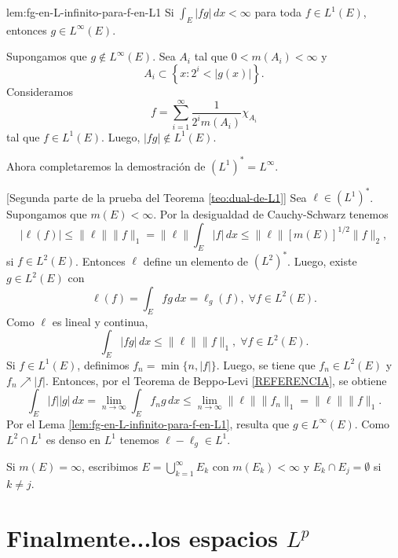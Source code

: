 \begin{lema}{lem:fg-en-L-infinito-para-f-en-L1}
Si 
$
\int_E |fg|\,dx <\infty
$
para toda $f \in L^1(E)$, entonces $g \in L^{\infty}(E)$.
\end{lema}

\begin{demo}
Supongamos que $g \notin L^{\infty}(E)$. Sea $A_i$ tal que $0<m(A_i)<\infty$ y 
\[
A_i\subset \left\{x: 2^i< |g(x)|\right\}.
\]
Consideramos  \[f = \sum\limits_{i=1}^{\infty} \frac{1}{2^im(A_i)} \chi_{A_i} \] tal que $f \in L^1(E)$. 
Luego, $|fg| \notin L^1(E)$.
\end{demo}

Ahora completaremos la demostraci\'on de
$(L^1)^*=L^{\infty}$.

\begin{demo}{}[Segunda parte de la prueba del Teorema \ref{teo:dual-de-L1}]
Sea $\ell \in (L^1)^*$. Supongamos que $m(E)<\infty$.
Por la desigualdad de Cauchy-Schwarz tenemos
\[
|\ell(f)|\leq \|\ell\|\|f\|_1=\|\ell\| \int_E |f|\,dx 
\leq \|\ell\| \left[m(E)\right]^{1/2}\|f\|_2, 
\]
si $f \in L^2(E)$.
Entonces $\ell$ define un elemento de $(L^2)^*$. Luego, existe $g \in L^2(E)$ con 
\[
\ell(f)=\int_E fg\,dx=\ell_g(f), \;\forall f \in L^2(E).
\]
Como $\ell$ es lineal y continua, 
\[
\int_E |fg|\,dx \leq \|\ell\| \|f\|_1, \;\forall f \in L^2(E).
\]
Si $f \in L^1(E)$, definimos $f_n=\min\{n, |f|\}$. Luego,  se tiene que $f_n \in L^2(E)$ y $f_n \nearrow |f|$. Entonces, por el Teorema de Beppo-Levi \ref{REFERENCIA}, se obtiene
\[
\int_E |f| |g|\,dx =\lim\limits_{n \to \infty} \int_E f_n g\,dx 
\leq \lim\limits_{n \to \infty} \|\ell\| \|f_n\|_1
=\|\ell\| \|f\|_1.\]
Por el Lema \ref{lem:fg-en-L-infinito-para-f-en-L1}, resulta que $g \in L^{\infty}(E)$.
Como $L^2 \cap L^1$ es denso en $L^1$ tenemos $\ell-\ell_g \in L^1$.

Si $m(E)=\infty$, escribimos $E=\bigcup\limits_{k=1}^{\infty} E_k$
con $m(E_k)<\infty$ y $E_k \cap E_j=\emptyset$ si $k \neq j$.
\end{demo}





\section{Finalmente...los espacios $L^p$}